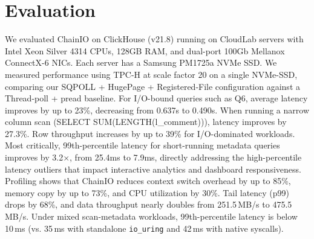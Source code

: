 \documentclass[sigconf,10pt]{acmart}
\newcommand{\sys}{ChainIO\xspace}
\begin{document}
\section{Evaluation}\label{sec:evaluation}

We evaluated \sys on ClickHouse (v21.8) running on CloudLab servers with Intel Xeon Silver 4314 CPUs, 128GB RAM, and dual-port 100Gb Mellanox ConnectX-6 NICs. Each server has a Samsung PM1725a NVMe SSD. We measured performance using TPC-H at scale factor 20 on a single NVMe-SSD, comparing our SQPOLL + HugePage + Registered-File configuration against a Thread-poll + pread baseline. For I/O-bound queries such as Q6, average latency improves by up to 23\%, decreasing from 0.637s to 0.490s. When running a narrow column scan (SELECT SUM(LENGTH(l\_comment))), latency improves by 27.3\%. Row throughput increases by up to 39\% for I/O-dominated workloads. Most critically, 99th-percentile latency for short-running metadata queries improves by 3.2×, from 25.4ms to 7.9ms, directly addressing the high-percentile latency outliers that impact interactive analytics and dashboard responsiveness. Profiling shows that \sys reduces context switch overhead by up to 85\%, memory copy by up to 73\%, and CPU utilization by 30\%. Tail latency (p99) drops by 68\%, and data throughput nearly doubles from 251.5\,MB/s to 475.5\,MB/s. Under mixed scan-metadata workloads, 99th-percentile latency is below 10\,ms (vs. 35\,ms with standalone \texttt{io\_uring} and 42\,ms with native syscalls).



\end{document}
